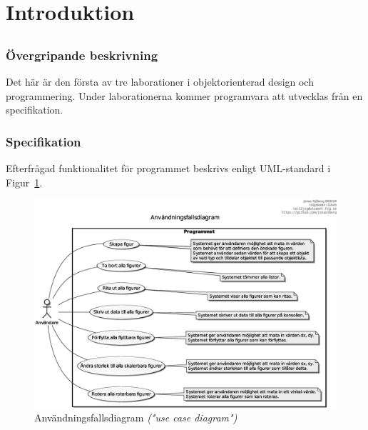 %
%
%

\section{Introduktion}\label{sec:intro}

\subsection{}\label{sec:uppg1a}
\subsubsection*{Övergripande beskrivning}
Det här är den första av tre laborationer i objektorienterad design och
programmering. Under laborationerna kommer programvara att utvecklas från en
specifikation. 

\subsubsection*{Specifikation}
Efterfrågad funktionalitet för programmet beskrivs enligt UML-standard i 
Figur~\ref{fig:usecase}.

\begin{figure}[htbp]
\centering
\includegraphics[width=\linewidth]{diagram/usecase.eps}
\caption{Användningsfallsdiagram \emph{("use case diagram")}}
\label{fig:usecase}
\end{figure}



